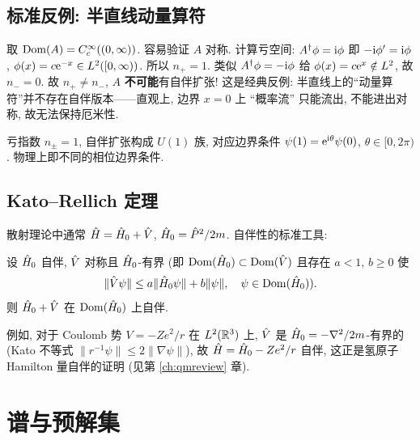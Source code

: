 \subsection{标准反例: 半直线动量算符}\label{subsec:hilbert-counterex}

\begin{example}[$\Op{P}=-\rmi\partial_x$ 在 $L^2([0,\infty))$]\label{ex:hilbert-halfline}
取 $\operatorname{Dom}(A)=C_c^\infty((0,\infty))$. 容易验证 $A$ 对称. 计算亏空间: $A^\dagger\phi=\mathrm{i}\phi$ 即 $-\mathrm{i}\phi'=\mathrm{i}\phi$, $\phi(x)=c\mathrm{e}^{-x}\in L^2([0,\infty))$. 所以 $n_+=1$. 类似 $A^\dagger\phi=-\mathrm{i}\phi$ 给 $\phi(x)=c\mathrm{e}^x\notin L^2$, 故 $n_-=0$. 故 $n_+\neq n_-$, $A$ \textbf{不可能}有自伴扩张! 这是经典反例: 半直线上的``动量算符''并不存在自伴版本——直观上, 边界 $x=0$ 上 ``概率流'' 只能流出, 不能进出对称, 故无法保持厄米性.
\end{example}

\begin{example}[{$\Op{P}=-\rmi\partial_x$ 在 $L^2([0,1])$}]
亏指数 $n_\pm=1$, 自伴扩张构成 $U(1)$ 族, 对应边界条件 $\psi(1)=\mathrm{e}^{\mathrm{i}\theta}\psi(0)$, $\theta\in[0,2\pi)$. 物理上即不同的相位边界条件.
\end{example}

\subsection{Kato--Rellich 定理}\label{subsec:hilbert-kato}

散射理论中通常 $\hat{H}=\hat{H}_0+\hat{V}$, $\hat{H}_0=\hat{P}^2/2m$. 自伴性的标准工具:

\begin{theorem}\label{thm:hilbert-kato}
设 $\hat{H}_0$ 自伴, $\hat{V}$ 对称且 $\hat{H}_0$-有界 (即 $\operatorname{Dom}(\hat{H}_0)\subset\operatorname{Dom}(\hat{V})$ 且存在 $a<1$, $b\geq 0$ 使
\begin{equation}\label{eq:hilbert-katobound}
\|\hat{V}\psi\|\leq a\|\hat{H}_0\psi\|+b\|\psi\|,\quad \psi\in\operatorname{Dom}(\hat{H}_0)).
\end{equation}
则 $\hat{H}_0+\hat{V}$ 在 $\operatorname{Dom}(\hat{H}_0)$ 上自伴.
\end{theorem}

例如, 对于 Coulomb 势 $V=-Ze^2/r$ 在 $L^2(\mathbb{R}^3)$ 上, $\hat{V}$ 是 $\hat{H}_0=-\nabla^2/2m$-有界的 (Kato 不等式 $\|r^{-1}\psi\|\leq 2\|\nabla\psi\|$), 故 $\hat{H}=\hat{H}_0-Ze^2/r$ 自伴, 这正是氢原子 Hamilton 量自伴的证明 (见第 \ref{ch:qmreview} 章).

\section{谱与预解集}\label{sec:hilbert-spectrum}

